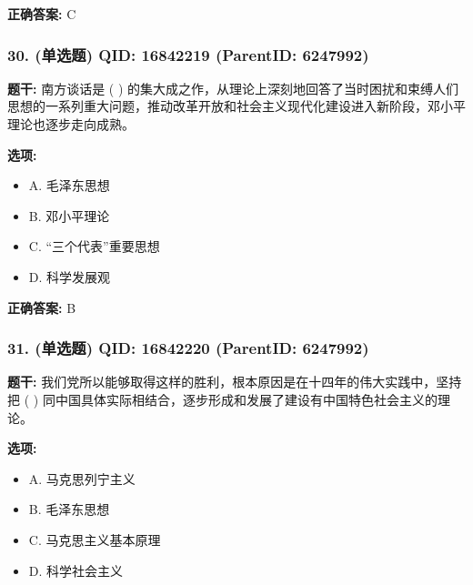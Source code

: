\documentclass[12pt,UTF8]{ctexart}
\begin{document}
\textbf{正确答案:}
C

\vspace{0.3em}\hrulefill\vspace{0.7em}

\subsubsection*{30. (单选题) \small QID: 16842219 (ParentID: 6247992)}

\textbf{题干:}
南方谈话是 ( ) 的集大成之作，从理论上深刻地回答了当时困扰和束缚人们思想的一系列重大问题，推动改革开放和社会主义现代化建设进入新阶段，邓小平理论也逐步走向成熟。



\textbf{选项:}
\begin{itemize}[leftmargin=*]

  \item A. 毛泽东思想

  \item B. 邓小平理论

  \item C. “三个代表”重要思想

  \item D. 科学发展观

\end{itemize}

\textbf{正确答案:}
B

\vspace{0.3em}\hrulefill\vspace{0.7em}

\subsubsection*{31. (单选题) \small QID: 16842220 (ParentID: 6247992)}

\textbf{题干:}
我们党所以能够取得这样的胜利，根本原因是在十四年的伟大实践中，坚持把 ( ) 同中国具体实际相结合，逐步形成和发展了建设有中国特色社会主义的理论。



\textbf{选项:}
\begin{itemize}[leftmargin=*]

  \item A. 马克思列宁主义

  \item B. 毛泽东思想

  \item C. 马克思主义基本原理

  \item D. 科学社会主义

\end{itemize}
\end{document}
